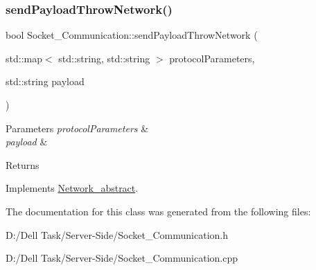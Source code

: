 \subsubsection{\texorpdfstring{send\+Payload\+Throw\+Network()}{sendPayloadThrowNetwork()}}
{\footnotesize\ttfamily bool Socket\+\_\+\+Communication\+::send\+Payload\+Throw\+Network (\begin{DoxyParamCaption}\item[{std\+::map$<$ std\+::string, std\+::string $>$}]{protocol\+Parameters,  }\item[{std\+::string}]{payload }\end{DoxyParamCaption})\hspace{0.3cm}{\ttfamily [virtual]}}






\begin{DoxyParams}{Parameters}
{\em protocol\+Parameters} & \\
\hline
{\em payload} & \\
\hline
\end{DoxyParams}
\begin{DoxyReturn}{Returns}

\end{DoxyReturn}


Implements \mbox{\hyperlink{class_network__abstract}{Network\+\_\+abstract}}.



The documentation for this class was generated from the following files\+:\begin{DoxyCompactItemize}
\item 
D\+:/\+Dell Task/\+Server-\/\+Side/Socket\+\_\+\+Communication.\+h\item 
D\+:/\+Dell Task/\+Server-\/\+Side/Socket\+\_\+\+Communication.\+cpp\end{DoxyCompactItemize}
